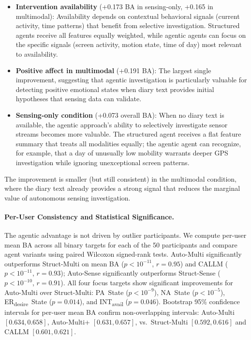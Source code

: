 \documentclass[screen,review,anonymous]{acmart}
\newcommand{\erdesire}{ER\textsubscript{desire}}
\newcommand{\intavail}{INT\textsubscript{avail}}
\begin{document}
\begin{itemize}[nosep]
    \item \textbf{Intervention availability} (+0.173 BA in sensing-only, +0.165 in multimodal): Availability depends on contextual behavioral signals (current activity, time patterns) that benefit from selective investigation. Structured agents receive all features equally weighted, while agentic agents can focus on the specific signals (screen activity, motion state, time of day) most relevant to availability.

    \item \textbf{Positive affect in multimodal} (+0.191 BA): The largest single improvement, suggesting that agentic investigation is particularly valuable for detecting positive emotional states when diary text provides initial hypotheses that sensing data can validate.

    \item \textbf{Sensing-only condition} (+0.073 overall BA): When no diary text is available, the agentic approach's ability to selectively investigate sensor streams becomes more valuable. The structured agent receives a flat feature summary that treats all modalities equally; the agentic agent can recognize, for example, that a day of unusually low mobility warrants deeper GPS investigation while ignoring unexceptional screen patterns.
\end{itemize}

The improvement is smaller (but still consistent) in the multimodal condition, where the diary text already provides a strong signal that reduces the marginal value of autonomous sensing investigation.

\paragraph{Per-User Consistency and Statistical Significance.}
The agentic advantage is not driven by outlier participants. We compute per-user mean BA across all binary targets for each of the 50 participants and compare agent variants using paired Wilcoxon signed-rank tests. Auto-Multi significantly outperforms Struct-Multi on mean BA ($p < 10^{-11}$, $r = 0.95$) and CALLM ($p < 10^{-11}$, $r = 0.93$); Auto-Sense significantly outperforms Struct-Sense ($p < 10^{-10}$, $r = 0.91$). All four focus targets show significant improvements for Auto-Multi over Struct-Multi: PA~State ($p < 10^{-9}$), NA~State ($p < 10^{-5}$), \erdesire{}~State ($p = 0.014$), and \intavail{} ($p = 0.046$). Bootstrap 95\% confidence intervals for per-user mean BA confirm non-overlapping intervals: Auto-Multi $[0.634, 0.658]$, Auto-Multi+ $[0.631, 0.657]$, vs.\ Struct-Multi $[0.592, 0.616]$ and CALLM $[0.601, 0.621]$.
\end{document}
